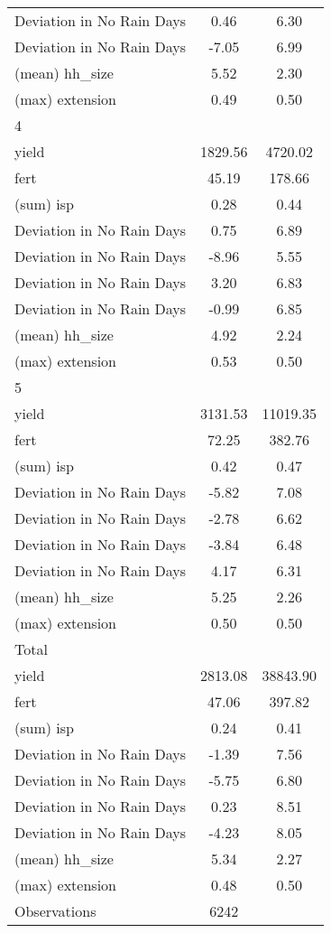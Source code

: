 {\begin{tabular}{l*{1}{cc}}
Deviation in No Rain Days&        0.46&        6.30\\
Deviation in No Rain Days&       -7.05&        6.99\\
(mean) hh\_size      &        5.52&        2.30\\
(max) extension     &        0.49&        0.50\\
\hline
4                   &            &            \\
yield               &     1829.56&     4720.02\\
fert                &       45.19&      178.66\\
(sum) isp           &        0.28&        0.44\\
Deviation in No Rain Days&        0.75&        6.89\\
Deviation in No Rain Days&       -8.96&        5.55\\
Deviation in No Rain Days&        3.20&        6.83\\
Deviation in No Rain Days&       -0.99&        6.85\\
(mean) hh\_size      &        4.92&        2.24\\
(max) extension     &        0.53&        0.50\\
\hline
5                   &            &            \\
yield               &     3131.53&    11019.35\\
fert                &       72.25&      382.76\\
(sum) isp           &        0.42&        0.47\\
Deviation in No Rain Days&       -5.82&        7.08\\
Deviation in No Rain Days&       -2.78&        6.62\\
Deviation in No Rain Days&       -3.84&        6.48\\
Deviation in No Rain Days&        4.17&        6.31\\
(mean) hh\_size      &        5.25&        2.26\\
(max) extension     &        0.50&        0.50\\
\hline
Total               &            &            \\
yield               &     2813.08&    38843.90\\
fert                &       47.06&      397.82\\
(sum) isp           &        0.24&        0.41\\
Deviation in No Rain Days&       -1.39&        7.56\\
Deviation in No Rain Days&       -5.75&        6.80\\
Deviation in No Rain Days&        0.23&        8.51\\
Deviation in No Rain Days&       -4.23&        8.05\\
(mean) hh\_size      &        5.34&        2.27\\
(max) extension     &        0.48&        0.50\\
\hline
Observations        &        6242&            \\
\hline\hline
\end{tabular}
}
